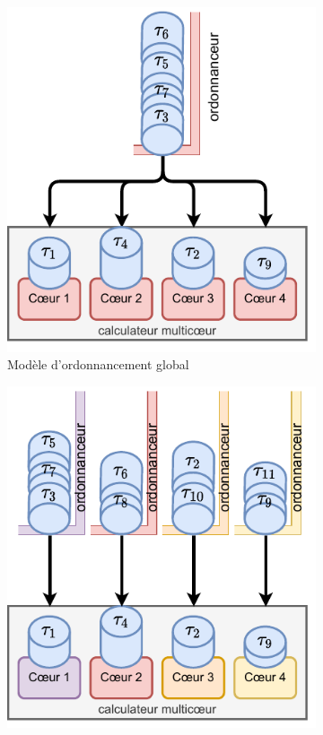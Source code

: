 \documentclass[french, a4paper, 11pt, twoside, pdftex]{StyleThese}
\begin{document}
    \begin{figure}[h!]
    	\centering
    	\begin{subfigure}{.45\textwidth} \centering
    		\includegraphics[width=\linewidth]{schemas/Ordonnancement_Global}
    		\caption{Modèle d'ordonnancement global}
    		\label{fig:globalScheduling}
    	\end{subfigure}
    	\begin{subfigure}{.45\textwidth} \centering
    		\includegraphics[width=\linewidth]{schemas/Ordonnancement_Partitionned}

\end{subfigure}
\end{figure}
\end{document}
